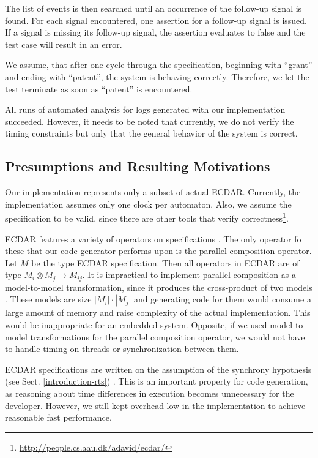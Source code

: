 The list of events is then searched until an occurrence of the follow-up signal
is found. For each signal encountered, one assertion for a follow-up signal is
issued. If a signal is missing its follow-up signal, the assertion evaluates to
false and the test case will result in an error.

We assume, that after one cycle through the specification, beginning with
``grant'' and ending with ``patent'', the system is behaving
correctly. Therefore, we let the test terminate as soon as ``patent'' is
encountered.

All runs of automated analysis for logs generated with our implementation
succeeded. However, it needs to be noted that currently, we do not verify the
timing constraints but only that the general behavior of the system is correct.

\subsection{Presumptions and Resulting Motivations}
\label{implementation-presumptions}

Our implementation represents only a subset of actual ECDAR. Currently, the
implementation assumes only one clock per automaton. Also, we assume the
specification to be valid, since there are other tools that verify
correctness\footnote{\url{http://people.cs.aau.dk/adavid/ecdar/}}.

ECDAR features a variety of operators on specifications
\cite{david_compositional_2012}. The only operator fo these that our code
generator performs upon is the parallel composition operator. Let $M$ be the
type ECDAR specification. Then all operators in ECDAR are of type $M_{i}\otimes
M_{j}\rightarrow M_{ij}$. It is impractical to implement parallel composition as
a model-to-model transformation, since it produces the cross-product of two
models \cite{david_compositional_2012}. These models are size
$|M_{i}|\cdot|M_{j}|$ and generating code for them would consume a large amount
of memory and raise complexity of the actual implementation. This would be
inappropriate for an embedded system. Opposite, if we used model-to-model
transformations for the parallel composition operator, we would not have to
handle timing on threads or synchronization between them.

ECDAR specifications are written on the assumption of the synchrony hypothesis
(see Sect. \ref{introduction-rts}) \cite{david_compositional_2012}.  This is an
important property for code generation, as reasoning about time differences in
execution becomes unnecessary for the developer.  However, we still kept
overhead low in the implementation to achieve reasonable fast performance.



